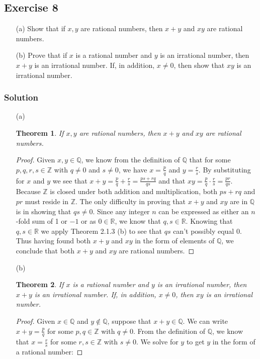 \documentclass[12pt]{article}
\newtheorem*{thm}{Theorem}
\begin{document}
\subsection*{Exercise 8}
\begin{itemize}
\item[(a)] Show that if $x, y$ are rational numbers, then $x + y$ and $xy$ are rational numbers.
\item[(b)] Prove that if $x$ is a rational number and $y$ is an irrational number, then $x + y$ is an irrational number. If, in addition, $x \neq 0$, then show that $xy$ is an irrational number.
\end{itemize}
\subsubsection*{Solution}
\begin{itemize}
\item[(a)]
\begin{thm}
If $x, y$ are rational numbers, then $x + y$ and $xy$ are rational numbers.
\end{thm}
\begin{proof}
Given $x, y \in \mathbb{Q}$, we know from the definition of $\mathbb{Q}$ that for some $p,q,r,s \in \mathbb{Z}$ with $q \neq 0$ and $s \neq 0$, we have $x = \frac{p}{q}$ and $y = \frac{r}{s}$. By substituting for $x$ and $y$ we see that $x + y = \frac{p}{q} + \frac{r}{s} = \frac{ps + rq}{qs}$ and that $xy = \frac{p}{q} \cdot \frac{r}{s} = \frac{pr}{qs}$. Because $\mathbb{Z}$ is closed under both addition and multiplication, both $ps + rq$ and $pr$ must reside in $\mathbb{Z}$. The only difficulty in proving that $x + y$ and $xy$ are in $\mathbb{Q}$ is in showing that $qs \neq 0$. Since any integer $n$ can be expressed as either an $n$-fold sum of 1 or $-1$ or as $0 \in \mathbb{R}$, we know that $q, s \in \mathbb{R}$. Knowing that $q, s \in \mathbb{R}$ we apply Theorem 2.1.3 (b) to see that $qs$ can't possibly equal $0$. Thus having found both $x + y$ and $xy$ in the form of elements of $\mathbb{Q}$, we conclude that both $x + y$ and $xy$ are rational numbers.
\end{proof}
\item[(b)]
\begin{thm}
If $x$ is a rational number and $y$ is an irrational number, then $x + y$ is an irrational number. If, in addition, $x \neq 0$, then $xy$ is an irrational number.
\end{thm}
\begin{proof}
Given $x \in \mathbb{Q}$ and $y \notin \mathbb{Q}$, suppose that $x + y \in \mathbb{Q}$. We can write $x + y = \frac{p}{q}$ for some $p, q \in \mathbb{Z}$ with $q \neq 0$. From the definition of $\mathbb{Q}$, we know that $x = \frac{r}{s}$ for some $r, s \in \mathbb{Z}$ with $s \neq 0$. We solve for $y$ to get $y$ in the form of a rational number:

\end{proof}
\end{itemize}
\end{document}
